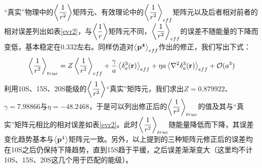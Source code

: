 \documentclass[cs4size,titlepage,twoside]{ctexart}
\begin{document}
“真实”物理中的$\displaystyle\expval{\frac{1}{r^2}}$矩阵元、有效理论中的$\displaystyle\expval{\frac{1}{r^2}}_{eff}$矩阵元以及后者相对前者的相对误差列出如表\ref{evr2}，与$\displaystyle\expval{\frac{1}{r}}$矩阵元不同，$\displaystyle\expval{\frac{1}{r^2}}_{eff}$的误差不随能量的下降而变低，基本稳定在$0.332$左右。同样仿造对$\expval{\vb{p^4}}_{eff}$作出的修正，我们写出下式：
\begin{equation}\label{r2true}
	\expval{\frac{1}{r^2}}_{true}=Z\expval{\frac{1}{r^2}}_{eff}+\frac{\gamma}{a}\expval{\delta^3_a(\vb{r})}_{eff}+\eta a\expval{\laplacian{\delta^3_a(\vb{r})}}_{eff}+\mathcal{O}(a^3)
\end{equation}
利用10S、15S、20S能级的$\displaystyle\expval{\frac{1}{r^2}}$“真实”矩阵元，我们求出$Z=0.879922$、$\gamma=7.98866$与$\eta=-48.2468$，于是可以列出修正后的$\displaystyle\expval{\frac{1}{r^2}}_{true}$的值及其与“真实”矩阵元相比的相对误差如表\ref{evr2}。此时$\displaystyle\expval{\frac{1}{r^2}}_{true}$随能量降低而下降，其误差变化趋势基本与$\expval{\vb{p}^4}$矩阵元一致。另外，以上提到的三种矩阵元修正后的误差均在10S之后仍保持下降趋势，直到15S趋于平缓，之后误差渐渐变大（这里均不计10S、15S、20S这几个用于匹配的能级）。
\end{document}
